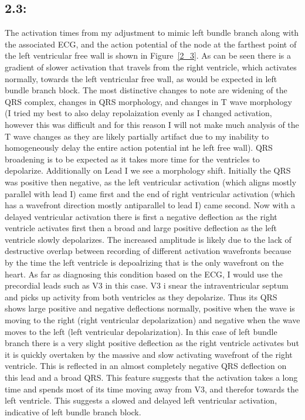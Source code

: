 \documentclass[12pt]{article}
\begin{document}
\subsection{2.3: }
The activation times from my adjustment to mimic left bundle branch along with the associated ECG, and the action potential of the node at the farthest point of the left ventricular free wall is shown in Figure~\ref{2_3}. As can be seen there is a gradient of slower activation that travels from the right ventricle, which activates normally, towards the left ventricular free wall, as would be expected in left bundle branch block. The most distinctive changes to note are widening of the QRS complex, changes in QRS morphology, and changes in T wave morphology (I tried my best to also delay repolaization evenly as I changed activation, however this was difficult and for this reason I will not make much analysis of the T wave changes as they are likely partially artifact due to my inability to homogeneously delay the entire action potential int he left free wall). QRS broadening is to be expected as it takes more time for the ventricles to depolarize. Additionally on Lead I we see a morphology shift. Initially the QRS was positive then negative, as the left ventricular activation (which aligns mostly parallel with lead I) came first and the end of right ventricular activation (which has a wavefront direction mostly antiparallel to lead I) came second. Now with a delayed ventricular activation there is first a negative deflection as the right ventricle activates first then a broad and large positive deflection as the left ventricle slowly depolarizes. The increased amplitude is likely due to the lack of destructive overlap between recording of different activation wavefronts because by the time the left ventricle is depoalrizing that is the only wavefront on the heart. As far as diagnosing this condition based on the ECG, I would use the precordial leads such as V3 in this case. V3 i snear the intraventricular septum and picks up activity from both ventricles as they depolarize. Thus its QRS shows large positive and negative deflections normally, positive when the wave is moving to the right (right ventricular depolarization) and negative when the wave moves to the left (left ventricular depolarization). In this case of left bundle branch there is a very slight positive deflection as the right ventricle activates but it is quickly overtaken by the massive and slow activating wavefront of the right ventricle. This is reflected in an almost completely negative QRS deflection on this lead and a broad QRS. This feature suggests that the activation takes a long time and spends most of its time moving away from V3, and therefor towards the left ventricle. This suggests a slowed and delayed left ventricular activation, indicative of left bundle branch block.
\end{document}
